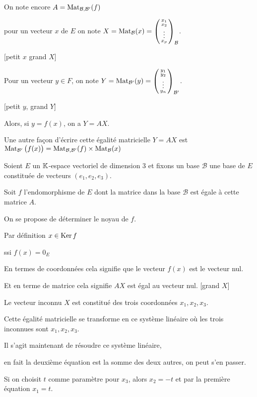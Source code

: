 \change
On note encore $A = \mathop{\mathrm{Mat}}\nolimits_{\mathcal{B},\mathcal{B}'} (f)$
  
\change
pour un vecteur $x$ de $E$ on note $X = \mathop{\mathrm{Mat}}\nolimits_{\mathcal{B}} (x) = 
  \left(\begin{smallmatrix}x_1\cr x_2\cr \vdots \cr x_p\end{smallmatrix}\right)_\mathcal{B}$.

[petit $x$ grand $X$]

\change
Pour un vecteur $y \in F$, on note $Y = \mathop{\mathrm{Mat}}\nolimits_{\mathcal{B}'} (y) = 
  \left(\begin{smallmatrix}y_1\cr y_2\cr \vdots \cr y_n\end{smallmatrix}\right)_{\mathcal{B}'}$.

[petit $y$, grand $Y$]
  
\change
Alors, si $y = f(x)$, on a $Y = AX$.

\change
Une autre façon d'écrire cette égalité matricielle $Y = AX$ est
$\mathop{\mathrm{Mat}}\nolimits_{\mathcal{B}'} \big( f(x) \big) 
= \mathop{\mathrm{Mat}}\nolimits_{\mathcal{B},\mathcal{B}'} (f) \times \mathop{\mathrm{Mat}}\nolimits_{\mathcal{B}} (x)$

\diapo

Soient $E$ un $\mathbb{K}$-espace vectoriel de dimension $3$  
et fixons un base $\mathcal{B}$ une base de
$E$ constituée de vecteurs $(e_1,e_2,e_3)$. 

\change
Soit $f$ l'endomorphisme de $E$ dont la matrice dans la base
$\mathcal{B}$ est égale à cette matrice $A$.

\change
On se propose de déterminer le noyau de $f$.

\change
Par définition 
$x  \in \mathop{\text{Ker}}\nolimits f$

\change
ssi $f(x)= 0_E$

\change
En termes de coordonnées cela signifie que le vecteur $f(x)$ est 
le vecteur nul.

\change
Et en terme de matrice cela signifie $AX$ est égal au vecteur nul. [grand $X$]

\change
Le vecteur inconnu $X$ est constitué des trois coordonnées $x_1,x_2,x_3$.

\change
Cette égalité matricielle se transforme en 
ce système linéaire où les trois inconnues sont
$x_1,x_2,x_3$.

\change
Il s'agit maintenant de résoudre ce système linéaire,

\change
en fait la deuxième équation est la somme des deux autres,
on peut s'en passer.

\change
Si on choisit $t$ comme paramètre pour $x_3$, alors $x_2=-t$ et par la première équation $x_1=t$.

